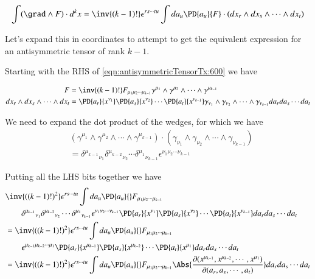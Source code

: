 \begin{equation}\label{eqn:antisymmetricTensorTx:600}
\int
( \grad \wedge F ) \cdot d^k x 
=
\inv{(k-1)!} \epsilon^{ r s \cdots t u } \int da_u \PD{a_{u}}{F} \cdot 
(dx_r \wedge dx_s \wedge \cdots \wedge dx_t)
\end{equation}

Let's expand this in coordinates to attempt to get the equivalent expression for an antisymmetric tensor of rank $k-1$.

Starting with the RHS of \ref{eqn:antisymmetricTensorTx:600} we have

\begin{align}\label{eqn:antisymmetricTensorTx:610}
F &= \inv{(k-1)!}
F_{\mu_1 \mu_2 \cdots \mu_{k-1} }
\gamma^{\mu_1} \wedge \gamma^{ \mu_2 } \wedge \cdots \wedge \gamma^{\mu_{k-1}} 
\\
dx_r \wedge dx_s \wedge \cdots \wedge dx_t &=
\PD{a_r}{x^{\nu_1}}
\PD{a_s}{x^{\nu_2}}
\cdots
\PD{a_t}{x^{\nu_{k-1}}}
\gamma_{\nu_1} \wedge \gamma_{ \nu_2 } \wedge \cdots \wedge \gamma_{\nu_{k-1}}
da_r da_s \cdots da_t
\end{align}

We need to expand the dot product of the wedges, for which we have
\begin{equation}\label{eqn:antisymmetricTensorTx:620}
\begin{aligned}
&\left( 
\gamma^{\mu_1} \wedge \gamma^{ \mu_2 } \wedge \cdots \wedge \gamma^{\mu_{k-1}} 
\right) 
\cdot
\left( 
\gamma_{\nu_1} \wedge \gamma_{ \nu_2 } \wedge \cdots \wedge \gamma_{\nu_{k-1}}
\right) \\
&=
{\delta^{\mu_{k-1}}}_{\nu_1}  {\delta^{ \mu_{k-2} }}_{\nu_2}  \cdots  {\delta^{\mu_{1}} }_{\nu_{k-1}}
\epsilon^{\nu_1 \nu_2 \cdots \nu_{k-1}}
\end{aligned}
\end{equation}

Putting all the LHS bits together we have
\begin{align*}
&\inv{((k-1)!)^2} \epsilon^{ r s \cdots t u } \int da_u \PD{a_{u}}{} F_{\mu_1 \mu_2 \cdots \mu_{k-1} } \\
&\qquad {\delta^{\mu_{k-1}}}_{\nu_1}  {\delta^{ \mu_{k-2} }}_{\nu_2}  \cdots  {\delta^{\mu_{1}} }_{\nu_{k-1}}
\epsilon^{\nu_1 \nu_2 \cdots \nu_{k-1}}
\PD{a_r}{x^{\nu_1}}
\PD{a_s}{x^{\nu_2}}
\cdots
\PD{a_t}{x^{\nu_{k-1}}}
da_r da_s \cdots da_t \\
&=\inv{((k-1)!)^2} \epsilon^{ r s \cdots t u } \int da_u \PD{a_{u}}{} F_{\mu_1 \mu_2 \cdots \mu_{k-1} } \\
&\qquad \epsilon^{\mu_{k-1} \mu_{k-2} \cdots \mu_{1}}
\PD{a_r}{x^{\mu_{k-1}}}
\PD{a_s}{x^{\mu_{k-2}}}
\cdots
\PD{a_t}{x^{\mu_1}}
da_r da_s \cdots da_t \\
&=
\inv{((k-1)!)^2} \epsilon^{ r s \cdots t u } \int da_u \PD{a_{u}}{} F_{\mu_1 \mu_2 \cdots \mu_{k-1} }
\Abs{\frac{\partial(
x^{\mu_{k-1}},x^{\mu_{k-2}},\cdots,x^{\mu_1}
)}{\partial(a_r, a_s, \cdots, a_t)}}
da_r da_s \cdots da_t \\
\end{align*}

